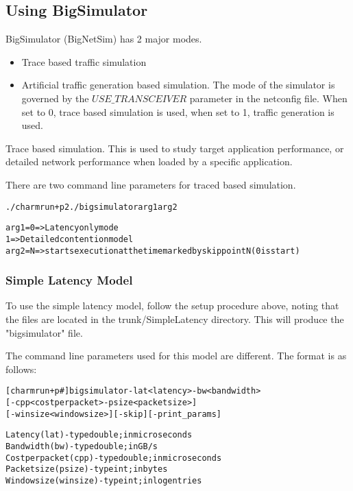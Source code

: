 \subsection{Using BigSimulator}

BigSimulator (BigNetSim) has 2 major modes.

\begin{itemize}
\item{ Trace based traffic simulation }
\item{Artificial traffic generation based simulation.
The mode of the simulator is governed by the $USE\_TRANSCEIVER$ parameter
in the netconfig file.  When set to 0, trace based simulation is used,
when set to 1, traffic generation is used.}
\end{itemize}

Trace based simulation.  This is used to study target application performance,
or detailed network performance when loaded by a specific application.

There are two command line parameters for traced based simulation.
\begin{alltt}
  ./charmrun +p2 ./bigsimulator arg1 arg2
\end{alltt}
\begin{alltt}
  arg1 = 0 => Latency only mode
         1 => Detailed contention model
  arg2 = N => starts execution at the time marked by skip point N (0 is start)
\end{alltt}

\subsubsection{Simple Latency Model}
To use the simple latency model, follow the setup procedure above, noting that
the files are located in the trunk/SimpleLatency directory. This will produce
the "bigsimulator" file.

The command line parameters used for this model are different.  The format is
as follows:

\begin{alltt}
  [charmrun +p#] bigsimulator -lat <latency> -bw <bandwidth>
               [-cpp <cost per packet> -psize <packet size>]
               [-winsize <window size>] [-skip] [-print\_params]
\end{alltt}

\begin{alltt}
  Latency (lat)         - type double; in microseconds
  Bandwidth (bw)        - type double; in GB/s
  Cost per packet (cpp) - type double; in microseconds
  Packet size (psize)   - type int; in bytes
  Window size (winsize) - type int; in log entries
\end{alltt}

